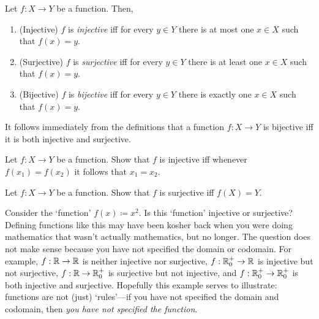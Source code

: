 \begin{dfn}
Let $f:X\rightarrow Y$ be a function.  Then,
\begin{enumerate}
\item (Injective) $f$ is \emph{injective} iff for every $y\in Y$ there is at most one $x\in X$ such that $f(x)=y$.
\item (Surjective) $f$ is \emph{surjective} iff for every $y\in Y$ there is at least one $x\in X$ such that $f(x)=y$.
\item (Bijective) $f$ is \emph{bijective} iff for every $y\in Y$ there is exactly one $x\in X$ such that $f(x)=y$.
\end{enumerate}
\end{dfn}
\begin{rmk}
It follows immediately from the definitions that a function $f:X\rightarrow Y$ is bijective iff it is both injective and surjective.
\end{rmk}
\begin{exr}
Let $f:X\rightarrow Y$ be a function.  Show that $f$ is injective iff whenever $f(x_1)=f(x_2)$ it follows that $x_1=x_2$.
\end{exr}
\begin{exr}\label{exrA.1.32}
Let $f:X\rightarrow Y$ be a function.  Show that $f$ is surjective iff $f(X)=Y$.
\end{exr}
\begin{exm}
Consider the `function' $f(x)\coloneqq x^2$.  Is this `function' injective or surjective?  Defining functions like this may have been kosher back when you were doing mathematics that wasn't actually mathematics, but no longer.  The question does not make sense because you have not specified the domain or codomain.  For example, $f:\mathbb{R} \rightarrow \mathbb{R}$ is neither injective nor surjective, $f:\mathbb{R} _0^+\rightarrow \mathbb{R}$ is injective but not surjective, $f:\mathbb{R} \rightarrow \mathbb{R} _0^+$ is surjective but not injective, and $f:\mathbb{R} _0^+\rightarrow \mathbb{R} _0^+$ is both injective and surjective.  Hopefully this example serves to illustrate:  functions are not (just) `rules'---if you have not specified the domain and codomain, then \emph{you have not specified the function}.
\end{exm}
